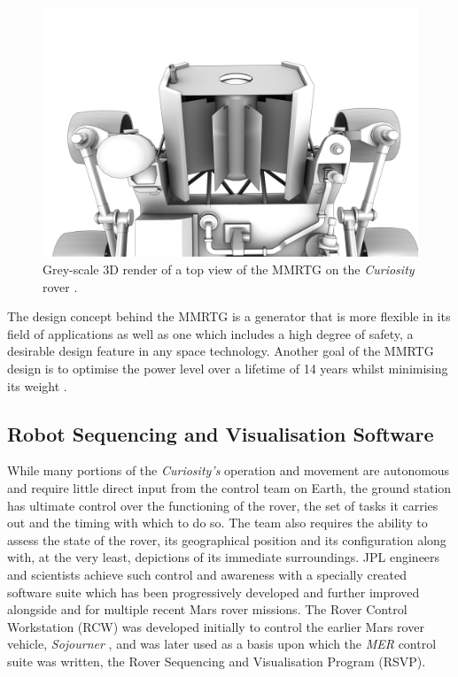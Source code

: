        \begin{figure}[h!]
          \centering
          \includegraphics[clip, trim=0cm 2cm 0cm 0cm, width=0.65\linewidth]{figures/litReview-mmrtgStructure}
          \caption[Grey-scale 3D render of a top view of the MMRTG on the \textit{Curiosity} rover.]{Grey-scale 3D render of a top view of the MMRTG on the \textit{Curiosity} rover \cite{nasa3D}.}
          \label{fig:litReview-mmrtgStructure}
        \end{figure}       
        
        The design concept behind the MMRTG is a generator that is more flexible in its field of applications as well as one which includes a high degree of safety, a desirable design feature in any space technology. Another goal of the MMRTG design is to optimise the power level over a lifetime of 14 years whilst minimising its weight \cite{srpsmmrtg}.
      
    \subsection{Robot Sequencing and Visualisation Software}
      While many portions of the \textit{Curiosity's} operation and movement are autonomous and require little direct input from the control team on Earth, the ground station has ultimate control over the functioning of the rover, the set of tasks it carries out and the timing with which to do so. The team also requires the ability to assess the state of the rover, its geographical position and its configuration along with, at the very least, depictions of its immediate surroundings. JPL engineers and scientists achieve such control and awareness with a specially created software suite which has been progressively developed and further improved alongside and for multiple recent Mars rover missions. The Rover Control Workstation (RCW) was developed initially to control the earlier Mars rover vehicle, \textit{Sojourner} \cite{cooper1998driving}, and was later used as a basis upon which the \textit{MER} control suite was written, the Rover Sequencing and Visualisation Program (RSVP).
      
